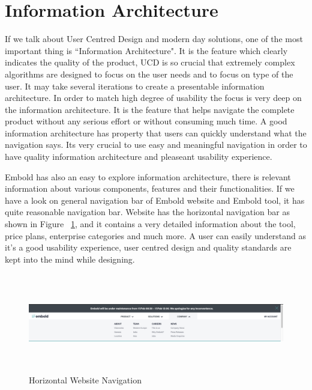 \section{Information Architecture}
If we talk about User Centred Design and modern day solutions, one of the most important thing is ``Information Architecture". It is the feature which clearly indicates the quality of the product, UCD is so crucial that extremely complex algorithms are designed to focus on the user needs and to focus on type of the user. It may take several iterations to create a presentable information architecture. In order to match high degree of usability the focus is very deep on the information architecture. It is the feature that helps navigate the complete product without any serious effort or without consuming much time. A good information architecture has property that users can quickly understand what the navigation says. Its very crucial to use easy and meaningful navigation in order to have quality information architecture and pleaseant usability experience. ~\cite{informationIA}\par
Embold has also an easy to explore information architecture, there is relevant information about various components, features and their functionalities.  If    we have a look on general navigation bar of Embold website and Embold tool, it has quite reasonable navigation bar. Website has the horizontal navigation bar as shown in Figure ~\ref{fig:horizontal}, and it contains a very detailed information about the tool, price plans, enterprise categories and much more. A user can easily understand as it's a good usability experience, user centred design and quality standards are kept into the mind while designing.\par
\begin{figure}[htbp]
\begin{center}
\includegraphics[width=6.5 in, height=1.7in]{Horizontal.png}
\caption{Horizontal Website Navigation}
\label{fig:horizontal}
\end{center}
\end{figure}

